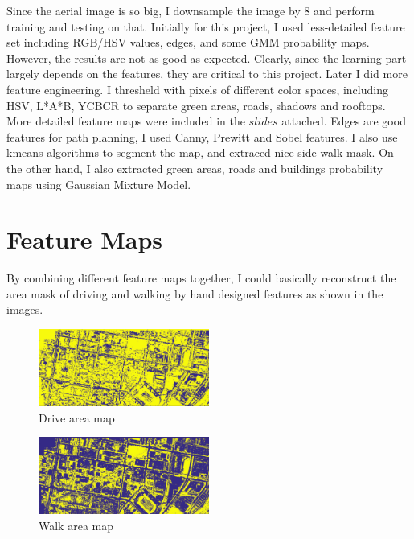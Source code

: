 \documentclass[letterpaper,twocolumn,10pt]{article}
\begin{document}
Since the aerial image is so big, I downsample the image by 8 and perform training and testing on that. Initially for this project, I used less-detailed feature set including RGB/HSV values, edges, and some GMM probability maps. However, the results are not as good as expected. Clearly, since the learning part largely depends on the features, they are critical to this project. Later I did more feature engineering. I thresheld with pixels of different color spaces, including HSV, L*A*B, YCBCR to separate green areas, roads, shadows and rooftops. More detailed feature maps were included in the $slides$ attached. Edges are good features for path planning, I used Canny, Prewitt and Sobel features. I also use kmeans algorithms to segment the map, and extraced nice side walk mask. On the other hand, I also extracted green areas, roads and buildings probability maps using Gaussian Mixture Model. \\

\section{Feature Maps}
By combining different feature maps together, I could basically reconstruct the area mask of driving and walking by hand designed features as shown in the images.\\


\begin{figure}[h]
    \centering
    \includegraphics[width=0.5\textwidth]{results/all_driving.jpg}
    \caption{Drive area map}
\end{figure}

\begin{figure}[h]
    \centering
    \includegraphics[width=0.5\textwidth]{results/all_greens.jpg}
    \caption{Walk area map}
\end{figure}
\end{document}
